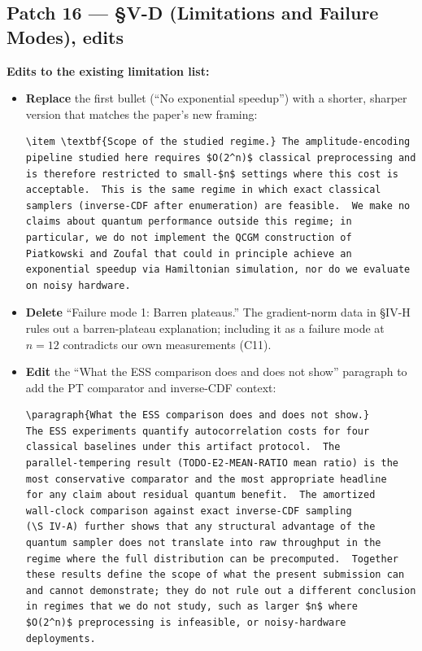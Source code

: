 \subsection*{Patch 16 --- \S V-D (Limitations and Failure Modes), edits}

\textbf{Edits to the existing limitation list:}

\begin{itemize}[leftmargin=*]
\item \textbf{Replace} the first bullet (``No exponential speedup'') with a
      shorter, sharper version that matches the paper's new framing:

\begin{verbatim}
\item \textbf{Scope of the studied regime.} The amplitude-encoding
pipeline studied here requires $O(2^n)$ classical preprocessing and
is therefore restricted to small-$n$ settings where this cost is
acceptable.  This is the same regime in which exact classical
samplers (inverse-CDF after enumeration) are feasible.  We make no
claims about quantum performance outside this regime; in
particular, we do not implement the QCGM construction of
Piatkowski and Zoufal that could in principle achieve an
exponential speedup via Hamiltonian simulation, nor do we evaluate
on noisy hardware.
\end{verbatim}

\item \textbf{Delete} ``Failure mode 1: Barren plateaus.''  The
      gradient-norm data in \S IV-H rules out a barren-plateau
      explanation; including it as a failure mode at $n = 12$
      contradicts our own measurements (C11).

\item \textbf{Edit} the ``What the ESS comparison does and does not show''
      paragraph to add the PT comparator and inverse-CDF context:

\begin{verbatim}
\paragraph{What the ESS comparison does and does not show.}
The ESS experiments quantify autocorrelation costs for four
classical baselines under this artifact protocol.  The
parallel-tempering result (TODO-E2-MEAN-RATIO mean ratio) is the
most conservative comparator and the most appropriate headline
for any claim about residual quantum benefit.  The amortized
wall-clock comparison against exact inverse-CDF sampling
(\S IV-A) further shows that any structural advantage of the
quantum sampler does not translate into raw throughput in the
regime where the full distribution can be precomputed.  Together
these results define the scope of what the present submission can
and cannot demonstrate; they do not rule out a different conclusion
in regimes that we do not study, such as larger $n$ where
$O(2^n)$ preprocessing is infeasible, or noisy-hardware deployments.
\end{verbatim}
\end{itemize}

